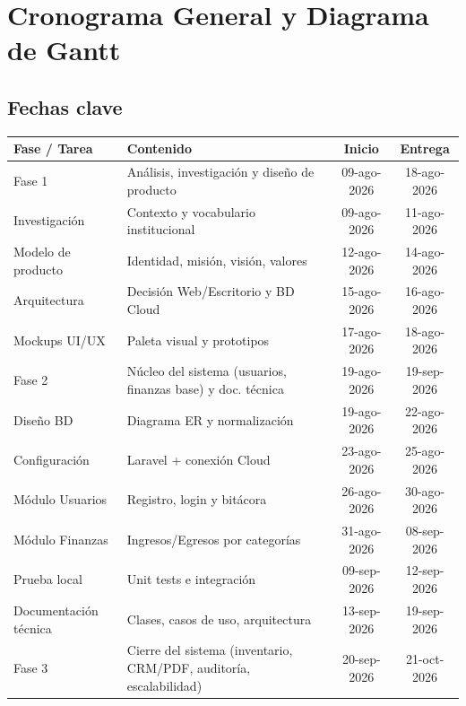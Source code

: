\documentclass[11pt,a4paper]{article}
\begin{document}
	
	
	\newpage
	
	\section{Cronograma General y Diagrama de Gantt}
	
	\subsection{Fechas clave}
	\begin{table}[h!]
		\centering
		\renewcommand{\arraystretch}{1.1}
		\begin{tabularx}{\textwidth}{l X c c}
			\toprule
			\textbf{Fase / Tarea} & \textbf{Contenido} & \textbf{Inicio} & \textbf{Entrega} \\
			\midrule
			Fase 1 & Análisis, investigación y diseño de producto & 09-ago-2026 & 18-ago-2026 \\
			\quad Investigación & Contexto y vocabulario institucional & 09-ago-2026 & 11-ago-2026 \\
			\quad Modelo de producto & Identidad, misión, visión, valores & 12-ago-2026 & 14-ago-2026 \\
			\quad Arquitectura & Decisión Web/Escritorio y BD Cloud & 15-ago-2026 & 16-ago-2026 \\
			\quad Mockups UI/UX & Paleta visual y prototipos & 17-ago-2026 & 18-ago-2026 \\
			\midrule
			Fase 2 & Núcleo del sistema (usuarios, finanzas base) y doc. técnica & 19-ago-2026 & 19-sep-2026 \\
			\quad Diseño BD & Diagrama ER y normalización & 19-ago-2026 & 22-ago-2026 \\
			\quad Configuración & Laravel + conexión Cloud & 23-ago-2026 & 25-ago-2026 \\
			\quad Módulo Usuarios & Registro, login y bitácora & 26-ago-2026 & 30-ago-2026 \\
			\quad Módulo Finanzas & Ingresos/Egresos por categorías & 31-ago-2026 & 08-sep-2026 \\
			\quad Prueba local & Unit tests e integración & 09-sep-2026 & 12-sep-2026 \\
			\quad Documentación técnica & Clases, casos de uso, arquitectura & 13-sep-2026 & 19-sep-2026 \\
			\midrule
			Fase 3 & Cierre del sistema (inventario, CRM/PDF, auditoría, escalabilidad) & 20-sep-2026 & 21-oct-2026 \\

\end{tabularx}
\end{table}
\end{document}
